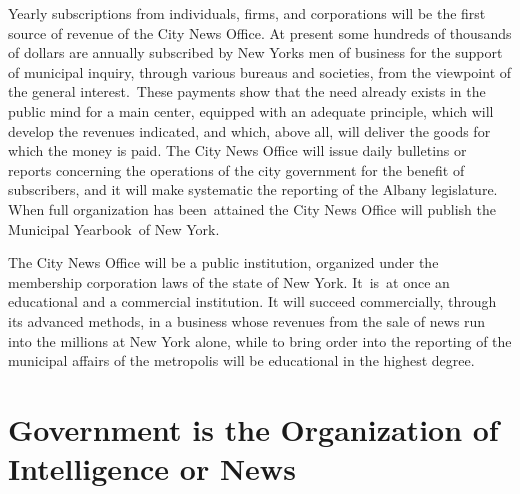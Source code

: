 \documentclass[twoside,symmetric,nobib,justified]{tufte-book}
\let\oldchapter\chapter
\def\chapter{%
  \setcounter{footnote}{0}%
  \oldchapter
}
\begin{document}
\enlargethispage{\baselineskip}

Yearly subscriptions from individuals, firms, and corporations will be
the first source of revenue of the City News Office. At present some
hundreds of thousands of dollars are annually subscribed by New
York\textquotesingle s men of business for the support of municipal
inquiry, through various bureaus and societies, from the viewpoint of
the general interest.~These payments show that the need already exists
in the public mind for a main center, equipped with an adequate
principle, which will develop the revenues indicated, and which, above
all, will deliver the goods for which the money is paid. The City News
Office will issue daily bulletins or reports concerning the operations
of the city government for the benefit of subscribers, and it will make
systematic the reporting of the Albany legislature. When full
organization has been~attained the City News Office will publish the
Municipal Yearbook~of New York.~

The City News Office will be a public institution, organized under the
membership corporation laws of the state of New York. It~is~at once an
educational and a commercial institution. It will succeed commercially,
through its advanced methods, in a business whose revenues from the sale
of news run into the millions at New York alone, while to bring order
into the reporting of the municipal affairs of the metropolis will be
educational in the highest degree.~

\vspace{.05in}

\hspace{3in}{\large F. F.}

\chapter[Government is the Organization of Intelligence or News]{Government is the Organization of\\\noindent Intelligence or News}
\label{ch:Government is the Organization of Intelligence or News}

\vspace{.2in}

\begin{LARGE}


\end{LARGE}
\end{document}
